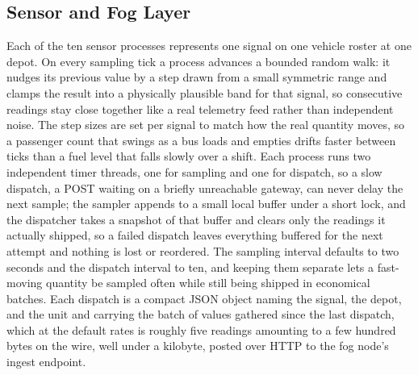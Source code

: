 \documentclass[conference]{IEEEtran}
\begin{document}
\subsection{Sensor and Fog Layer}

Each of the ten sensor processes represents one signal on one vehicle roster at one depot. On every sampling tick a process advances a bounded random walk: it nudges its previous value by a step drawn from a small symmetric range and clamps the result into a physically plausible band for that signal, so consecutive readings stay close together like a real telemetry feed rather than independent noise. The step sizes are set per signal to match how the real quantity moves, so a passenger count that swings as a bus loads and empties drifts faster between ticks than a fuel level that falls slowly over a shift. Each process runs two independent timer threads, one for sampling and one for dispatch, so a slow dispatch, a POST waiting on a briefly unreachable gateway, can never delay the next sample; the sampler appends to a small local buffer under a short lock, and the dispatcher takes a snapshot of that buffer and clears only the readings it actually shipped, so a failed dispatch leaves everything buffered for the next attempt and nothing is lost or reordered. The sampling interval defaults to two seconds and the dispatch interval to ten, and keeping them separate lets a fast-moving quantity be sampled often while still being shipped in economical batches. Each dispatch is a compact JSON object naming the signal, the depot, and the unit and carrying the batch of values gathered since the last dispatch, which at the default rates is roughly five readings amounting to a few hundred bytes on the wire, well under a kilobyte, posted over HTTP to the fog node's ingest endpoint.
\end{document}
